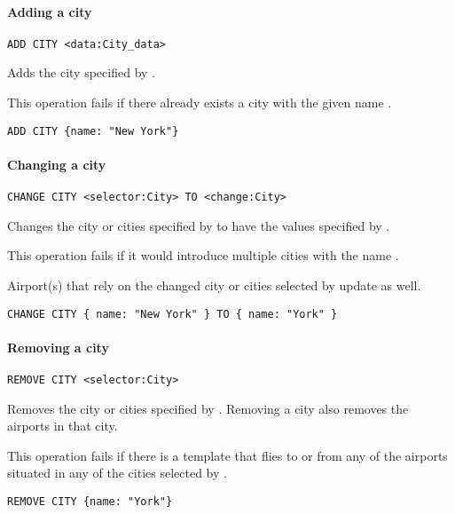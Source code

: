 \paragraph{Adding a city}
\begin{operation}
  \lstinline{ADD CITY <data:City_data>}
  \label{op:add_city}
\end{operation}
Adds the city specified by .

This operation fails if there already exists a city with the given
name .

\begin{texa}
  \lstinline|ADD CITY {name: "New York"}|
\end{texa}

\paragraph{Changing a city}
\begin{operation}
    \lstinline|CHANGE CITY <selector:City> TO <change:City>|
    \label{op:change_city}
\end{operation}
Changes the city or cities specified by  to have the values
specified by .

This operation fails if it would introduce multiple cities with the name
.

Airport(s) that rely on the changed city or cities selected by 
update as well.

\begin{texa}
  \lstinline|CHANGE CITY { name: "New York" } TO { name: "York" }|
\end{texa}

\paragraph{Removing a city}
\begin{operation}
  \lstinline{REMOVE CITY <selector:City>}
  \label{op:remove_city}
\end{operation}
Removes the city or cities specified by . Removing a city also
removes the airports in that city.

This operation fails if there is a template that flies to or from any of the
airports situated in any of the cities selected by .

\begin{texa}
  \lstinline|REMOVE CITY {name: "York"}|
\end{texa}


